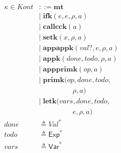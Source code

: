 \documentclass[12pt,draft]{article}
\begin{document}
{\begin{multicols*}{2}
\begin{center}
\begin{align*}
\kappa \in \textit{Kont} &::= \textbf{mt} \\
        &|\; \textbf{ifk}(e, e, \rho, a) \\
        &|\; \textbf{callcck}(a) \\
        &|\; \textbf{setk}(x, \rho, a) \\
        &|\; \textbf{appappk}(val?, e, \rho, a) \\
        &|\; \textbf{appk}(done, todo, \rho, a) \\
        &|\; \textbf{appprimk}(op, a) \\
        &|\; \textbf{primk}(op, done, todo, \\
        &\;\;\;\;\;\;\;\;\;\;\;\;\;\;\;\;\;\rho, a) \\
        &|\; \textbf{letk}(vars, done, todo, \\
        &\;\;\;\;\;\;\;\;\;\;\;\;\;\;\;\;\;e, \rho, a) \\
done &\triangleq \textit{Val}^\ast \\
todo &\triangleq \textsf{Exp}^* \\
vars &\triangleq \textsf{Var}^*
\end{align*}
\end{center}
\end{multicols*}
}
\end{document}
